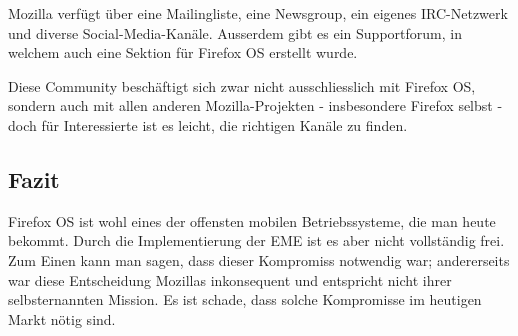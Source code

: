 Mozilla verfügt über eine Mailingliste\cite{online:mozilla-mailinglist}, eine Newsgroup\cite{online:mozilla-community}, ein eigenes IRC-Netzwerk\cite{online:mozilla-community} und diverse Social-Media-Kanäle\cite{online:mozilla-google-group}\cite{online:mozilla-twitter}. Ausserdem gibt es ein Supportforum\cite{online:mozilla-support}, in welchem auch eine Sektion für Firefox OS erstellt wurde. 

Diese Community beschäftigt sich zwar nicht ausschliesslich mit Firefox OS, sondern auch mit allen anderen Mozilla-Projekten - insbesondere Firefox selbst - doch für Interessierte ist es leicht, die richtigen Kanäle zu finden.\\

\subsection{Fazit}
Firefox OS ist wohl eines der offensten mobilen Betriebssysteme, die man heute bekommt. Durch die Implementierung der EME ist es aber nicht vollständig frei. Zum Einen kann man sagen, dass dieser Kompromiss notwendig war; andererseits war diese Entscheidung Mozillas inkonsequent und entspricht nicht ihrer selbsternannten Mission. Es ist schade, dass solche Kompromisse im heutigen Markt nötig sind.